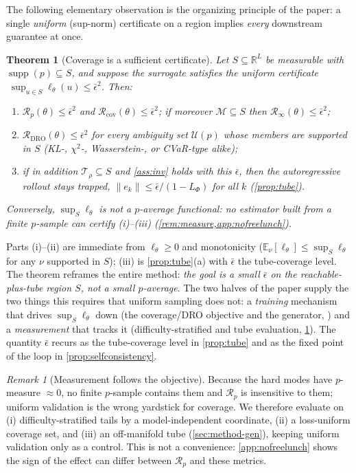 \documentclass{article}
\theoremstyle{plain}
\newtheorem{theorem}{Theorem}
\theoremstyle{definition}
\theoremstyle{remark}
\newtheorem{remark}{Remark}
\DeclareMathOperator{\supp}{supp}
\newcommand{\R}{\mathbb{R}}
\newcommand{\E}{\mathbb{E}}
\newcommand{\state}{u}
\newcommand{\manifold}{\mathcal{M}}
\newcommand{\sol}{\Phi}
\newcommand{\lossf}{\ell_\theta}
\newcommand{\pnat}{p}
\newcommand{\Rp}{\mathcal{R}_{\pnat}}
\newcommand{\Rinf}{\mathcal{R}_{\infty}}
\newcommand{\Rcov}{\mathcal{R}_{\mathrm{cov}}}
\newcommand{\Rdro}{\mathcal{R}_{\mathrm{DRO}}}
\newcommand{\tube}{\mathcal{T}_{\rho}}
\begin{document}
The following elementary observation is the organizing principle of the paper: a single
\emph{uniform} (sup-norm) certificate on a region implies \emph{every} downstream guarantee at once.
\begin{theorem}[Coverage is a sufficient certificate]\label{thm:coverage}
Let $S\subseteq\R^L$ be measurable with $\supp(\pnat)\subseteq S$, and suppose the surrogate satisfies the
uniform certificate $\;\sup_{\state\in S}\lossf(\state)\le\bar\epsilon^{2}$. Then:
\begin{enumerate}[label=(\roman*),leftmargin=2.2em,topsep=2pt,itemsep=1pt]
\item $\Rp(\theta)\le\bar\epsilon^{2}$ and $\Rcov(\theta)\le\bar\epsilon^{2}$; if moreover $\manifold\subseteq S$ then $\Rinf(\theta)\le\bar\epsilon^{2}$;
\item $\Rdro(\theta)\le\bar\epsilon^{2}$ for \emph{every} ambiguity set $\mathcal U(\pnat)$ whose members are supported in $S$ (KL-, $\chi^2$-, Wasserstein-, or CVaR-type alike);
\item if in addition $\tube\subseteq S$ and \cref{ass:inv} holds with this $\bar\epsilon$, then the autoregressive rollout stays trapped, $\|e_k\|\le\bar\epsilon/(1-L_{\sol})$ for all $k$ (\cref{prop:tube}).
\end{enumerate}
Conversely, $\sup_{S}\lossf$ is not a $\pnat$-average functional: no estimator built from a finite
$\pnat$-sample can certify (i)--(iii) (\cref{rem:measure,app:nofreelunch}).
\end{theorem}
Parts (i)--(ii) are immediate from $\lossf\ge0$ and monotonicity ($\E_\nu[\lossf]\le\sup_S\lossf$ for any
$\nu$ supported in $S$); (iii) is \cref{prop:tube}(a) with $\bar\epsilon$ the tube-coverage level. The
theorem reframes the entire method: \emph{the goal is a small $\bar\epsilon$ on the reachable-plus-tube
region $S$, not a small $\pnat$-average}. The two halves of the paper supply the two things this requires
that uniform sampling does not: a \emph{training} mechanism that drives $\sup_S\lossf$ down (the
coverage/DRO objective and the generator, ) and a
\emph{measurement} that tracks it (difficulty-stratified and tube evaluation, \cref{rem:measure}). The
quantity $\bar\epsilon$ recurs as the tube-coverage level in \cref{prop:tube} and as the fixed point of
the loop in \cref{prop:selfconsistency}.

\begin{remark}[Measurement follows the objective]\label{rem:measure}
Because the hard modes have $\pnat$-measure $\approx 0$, no finite $\pnat$-sample contains them and $\Rp$
is insensitive to them; uniform validation is the wrong yardstick for coverage. We therefore evaluate on
(i) difficulty-stratified tails by a model-independent coordinate, (ii) a loss-uniform coverage set, and
(iii) an off-manifold tube (\cref{sec:method-gen}), keeping uniform validation only as a control. This is
not a convenience: \cref{app:nofreelunch} shows the sign of the effect can differ between $\Rp$ and these
metrics.
\end{remark}
\end{document}
